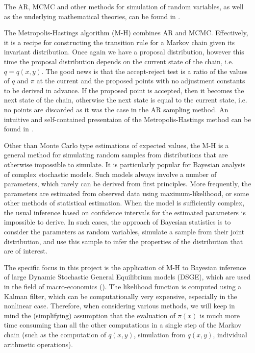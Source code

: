 \documentclass[11pt]{article}       %
\begin{document}
The AR, MCMC and other methods for simulation of random variables, as well as 
the underlying mathematical theories, can be found in \cite{ross.simulation}.


The Metropolis-Hastings algorithm (M-H) combines AR and MCMC.  Effectively, it
is a recipe for constructing the transition rule for a Markov chain given its
invariant distribution.  Once again we have a proposal distribution, however
this time the proposal distribution depends on the current state of the chain,
i.e. $q=q(x,y)$. The good news is that the accept-reject test is a ratio of the
values of $q$ and $\pi$ at the current and the proposed points with no
adjustment constants to be derived in advance.  If the proposed point is
accepted, then it becomes the next state of the chain, otherwise the next state
is equal to the current state, i.e. no points are discarded as it was the case
in the AR sampling method.  An intuitive and self-contained presentaion of the
Metropolis-Hastings method can be found in \cite{understanding.MH}.

Other than Monte Carlo type estimations of expected values, the M-H is a
general method for simulating random samples from distributions that are
otherwise impossible to simulate.  It is particularly popular for Bayesian
analysis of complex stochastic models.  Such models always involve a number of
parameters, which rarely can be derived from first principles.  More
frequently, the parameters are estimated from observed data using
maximum-likelihood, or some other methods of statistical estimation.  When the
model is sufficiently complex, the usual inference based on confidence
intervals for the estimated parameters is impossible to derive.  In such cases,
the approach of Bayesian statistics is to consider the parameters as random
variables,  simulate a sample from their joint distribution, and use this
sample to infer the properties of the distribution that are of interest.

The specific focus in this project is the application of M-H to Bayesian
inference of large Dynamic Stochastic General Equilibrium models (DSGE), which
are used in the field of macro-economics (\cite{strid2010adaptive}).  The
likelihood function is computed using a Kalman filter, which can be
computationally very expensive, especially in the nonlinear case.  Therefore,
when considering various methods, we will keep in mind the (simplifying)
assumption that the evaluation of $\pi(x)$ is much more time consuming than all
the other computations in a single step of the Markov chain (such as the
computation of $q(x,y)$, simulation from $q(x,y)$, individual arithmetic
operations). 
\end{document}
